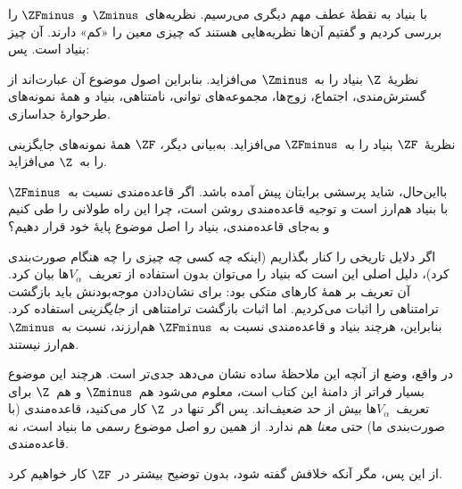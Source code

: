 \documentclass[../../../include/open-logic-section]{subfiles}
\begin{document}

با بنیاد به نقطهٔ عطف مهم دیگری می‌رسیم. نظریه‌های~$\Zminus$ و~$\ZFminus$
را بررسی کردیم و گفتیم آن‌ها نظریه‌هایی هستند که چیزی معین را «کم» دارند.
آن چیز بنیاد است. پس:

\begin{defn}
نظریهٔ~$\Z$ بنیاد را به~$\Zminus$ می‌افزاید. بنابراین اصول موضوع آن
عبارت‌اند از گسترش‌مندی، اجتماع، زوج‌ها، مجموعه‌های توانی، نامتناهی،
بنیاد و همهٔ نمونه‌های طرحوارهٔ جداسازی.

نظریهٔ~$\ZF$ بنیاد را به~$\ZFminus$ می‌افزاید. به‌بیانی دیگر، $\ZF$
همهٔ نمونه‌های جایگزینی را به~$\Z$ می‌افزاید.
\end{defn}

بااین‌حال، شاید پرسشی برایتان پیش آمده باشد. اگر قاعده‌مندی نسبت
به~$\ZFminus$ با بنیاد هم‌ارز است و توجیه قاعده‌مندی روشن است، چرا این
راه طولانی را طی کنیم و به‌جای قاعده‌مندی، بنیاد را اصل موضوع پایهٔ خود
قرار دهیم؟

اگر دلایل تاریخی را کنار بگذاریم (اینکه چه کسی چه چیزی را چه هنگام
صورت‌بندی کرد)، دلیل اصلی این است که بنیاد را می‌توان بدون استفاده از
تعریف~$V_\alpha$ها بیان کرد. آن تعریف بر همهٔ کارهای
 متکی بود: برای نشان‌دادن موجه‌بودنش باید بازگشت
ترامتناهی را اثبات می‌کردیم. اما اثبات بازگشت ترامتناهی از
\emph{جایگزینی} استفاده کرد. بنابراین، هرچند بنیاد و قاعده‌مندی نسبت
به~$\ZFminus$ هم‌ارزند، نسبت به~$\Zminus$ هم‌ارز نیستند.

در واقع، وضع از آنچه این ملاحظهٔ ساده نشان می‌دهد جدی‌تر است. هرچند این
موضوع بسیار فراتر از دامنهٔ این کتاب است، معلوم می‌شود هم~$\Zminus$ و
هم~$\Z$ برای تعریف~$V_\alpha$ها بیش از حد ضعیف‌اند. پس اگر تنها
در~$\Z$ کار می‌کنید، قاعده‌مندی (با صورت‌بندی ما) حتی \emph{معنا} هم
ندارد. از همین رو اصل موضوع رسمی ما بنیاد است، نه قاعده‌مندی.

از این پس، مگر آنکه خلافش گفته شود، بدون توضیح بیشتر در~$\ZF$ کار خواهیم
کرد.
\end{document}
